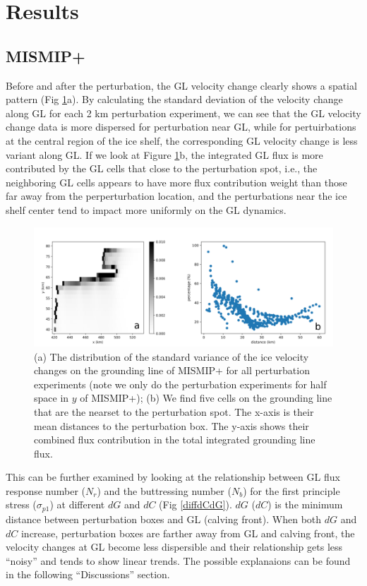 \documentclass[review,oneside]{igs}
\begin{document}
\section{Results}
\subsection{MISMIP+}
Before and after the perturbation, the GL velocity change clearly shows a spatial pattern (Fig \ref{stndVarFluxP}a). By calculating the standard deviation of the velocity change along GL for each 2 km perturbation experiment, we can see that the GL velocity change data is more dispersed for perturbation near GL, while for pertuirbations at the central region of the ice shelf, the corresponding GL velocity change is less variant along GL. If we look at Figure \ref{stndVarFluxP}b, the integrated GL flux is more contributed by the GL cells that close to the perturbation spot, i.e., the neighboring GL cells appears to have more flux contribution weight than those far away from the perperturbation location, and the perturbations near the ice shelf center tend to impact more uniformly on the GL dynamics.

\begin{figure}
\centering
\includegraphics[width=1\linewidth]{figs/stndVarFluxP.pdf}
\caption{(a) The distribution of the standard variance of the ice velocity changes on the grounding line of MISMIP+ for all perturbation experiments (note we only do the perturbation experiments for half space in $y$ of MISMIP+); (b) We find five cells on the grounding line that are the nearset to the perturbation spot. The x-axis is their mean distances to the perturbation box. The y-axis shows their combined flux contribution in the total integrated grounding line flux.}
\label{stndVarFluxP}
\end{figure}

This can be further examined by looking at the relationship between GL flux response number ($N_r$) and the buttressing number ($N_b$) for the first principle stress ($\sigma_{p1}$) at different $dG$ and $dC$ (Fig \ref{diffdCdG}). $dG$ ($dC$) is the minimum distance between perturbation boxes and GL (calving front). When both $dG$ and $dC$ increase, perturbation boxes are farther away from GL and calving front, the velocity changes at GL become less dispersible and their relationship gets less ``noisy'' and tends to show linear trends. The possible explanaions can be found in the following ``Discussions'' section.
\end{document}
